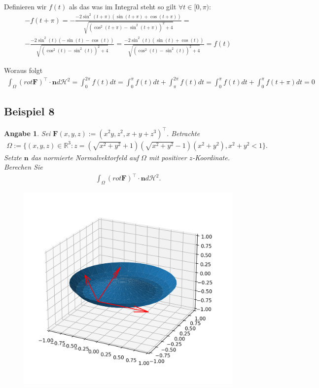 \documentclass[]{article}
\newtheorem*{angabe*}{Angabe}
\begin{document}
Definieren wir $f(t)$ als das was im Integral steht so gilt $\forall t \in [0, \pi):$
\begin{align*}
	-f(t+\pi) = -\frac{-2\sin^2(t+\pi) (\sin(t+\pi)+\cos(t+\pi))}{\sqrt{(\cos^2(t+\pi)-\sin^2(t+\pi))^2 + 4}} =\\
	-\frac{-2\sin^2(t) (-\sin(t)-\cos(t))}{\sqrt{(\cos^2(t)-\sin^2(t))^2 + 4}} =
	\frac{-2\sin^2(t) (\sin(t)+\cos(t))}{\sqrt{(\cos^2(t)-\sin^2(t))^2 + 4}} = f(t)
\end{align*}

Woraus folgt
\begin{align*}
	\int_\Omega (rot \bm{F})^\top \cdot \bm{n} d\mathcal{H}^2 = \int_0^{2\pi} f(t) dt = \int_0^{\pi} f(t) dt + \int_\pi^{2\pi} f(t) dt = \int_0^{\pi} f(t) dt + \int_0^{\pi} f(t+\pi) dt = 0
\end{align*}

\newpage

\subsection*{Beispiel 8}
\begin{angabe*}
	Sei $\bm{F}(x,y,z):=(x^2y, z^2, x+y+z^3)^\top$. Betrachte
	\begin{align*}
		\Omega := \{(x,y,z) \in \mathbb{R}^3: z=(\sqrt{x^2+y^2}+1)(\sqrt{x^2+y^2}-1)(x^2+y^2), x^2+y^2 < 1\}.
	\end{align*}
	Setzte $\bm{n}$ das normierte Normalvektorfeld auf $\Omega$ mit positiver $z$-Koordinate. Berechen Sie
	\begin{align*}
		\int_\Omega (rot \bm{F})^\top \cdot \bm{n} d\mathcal{H}^2.
	\end{align*}
\end{angabe*}

\begin{figure}[h!]
	\center
	\includegraphics[width=0.5\columnwidth]{bsp_8.png}
\end{figure}
\end{document}
